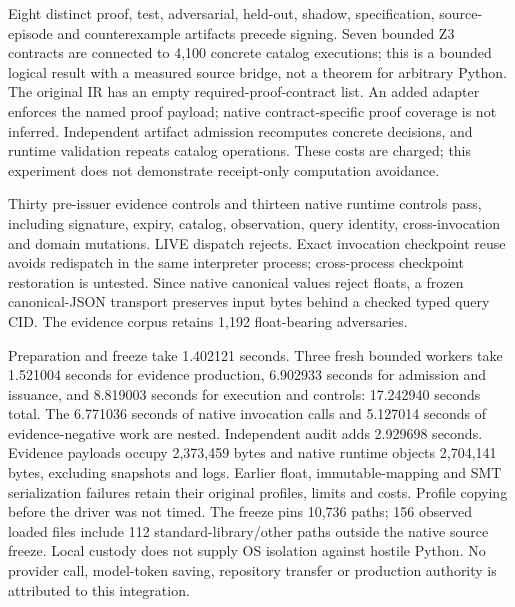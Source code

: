 Eight distinct proof, test, adversarial, held-out, shadow, specification,
source-episode and counterexample artifacts precede signing. Seven bounded Z3
contracts are connected to 4,100 concrete catalog executions; this is a bounded
logical result with a measured source bridge, not a theorem for arbitrary Python.
The original IR has an empty required-proof-contract list. An added adapter
enforces the named proof payload; native contract-specific proof coverage is
not inferred. Independent artifact admission recomputes concrete decisions,
and runtime validation repeats catalog operations. These costs are charged;
this experiment does not demonstrate receipt-only computation avoidance.

Thirty pre-issuer evidence controls and thirteen native runtime controls pass,
including signature, expiry, catalog, observation, query identity, cross-invocation
and domain mutations. LIVE dispatch rejects. Exact invocation checkpoint reuse
avoids redispatch in the same interpreter process; cross-process checkpoint
restoration is untested. Since native canonical values reject floats, a frozen
canonical-JSON transport preserves input bytes behind a checked typed query CID.
The evidence corpus retains 1,192 float-bearing adversaries.

Preparation and freeze take 1.402121 seconds. Three fresh bounded workers take
1.521004 seconds for evidence production, 6.902933 seconds for admission and
issuance, and 8.819003 seconds for execution and controls: 17.242940 seconds
total. The 6.771036 seconds of native invocation calls and 5.127014 seconds of
evidence-negative work are nested. Independent audit adds 2.929698 seconds.
Evidence payloads occupy 2,373,459 bytes and native runtime objects 2,704,141
bytes, excluding snapshots and logs. Earlier float, immutable-mapping and SMT
serialization failures retain their original profiles, limits and costs.
Profile copying before the driver was not timed. The freeze pins 10,736 paths;
156 observed loaded files include 112 standard-library/other paths outside the
native source freeze. Local custody does not supply OS isolation against hostile
Python. No provider call, model-token saving, repository transfer or production
authority is attributed to this integration.
